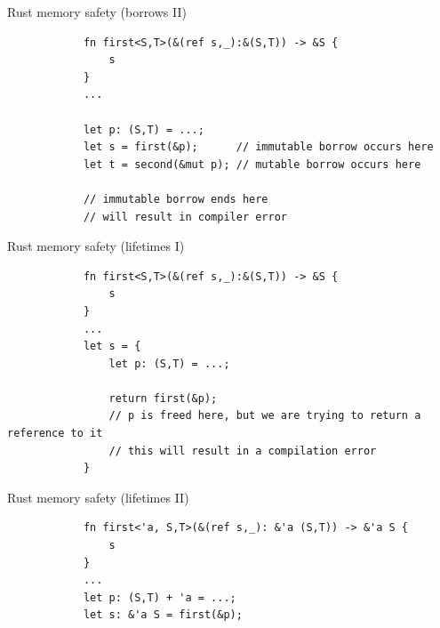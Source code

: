 \documentclass[usenames,dvipsnames,aspectratio=169]{beamer}
\begin{document}
\begin{frame}[fragile]{Rust memory safety (borrows II)}
    \begin{block}{}
        \begin{verbatim}
            fn first<S,T>(&(ref s,_):&(S,T)) -> &S {
                s
            }
            ...
            
            let p: (S,T) = ...;
            let s = first(&p);      // immutable borrow occurs here
            let t = second(&mut p); // mutable borrow occurs here

            // immutable borrow ends here
            // will result in compiler error
        \end{verbatim}
    \end{block}
\end{frame}

\begin{frame}[fragile]{Rust memory safety (lifetimes I)}
    \begin{block}{}
        \begin{verbatim}
            fn first<S,T>(&(ref s,_):&(S,T)) -> &S {
                s
            }
            ...
            let s = {
                let p: (S,T) = ...;
    
                return first(&p);
                // p is freed here, but we are trying to return a reference to it
                // this will result in a compilation error
            }
        \end{verbatim}
    \end{block}
\end{frame}

\begin{frame}[fragile]{Rust memory safety (lifetimes II)}
    \begin{block}{}
        \begin{verbatim}
            fn first<'a, S,T>(&(ref s,_): &'a (S,T)) -> &'a S {
                s
            }
            ...
            let p: (S,T) + 'a = ...;
            let s: &'a S = first(&p);
        \end{verbatim}
    \end{block}
\end{frame}
\end{document}
